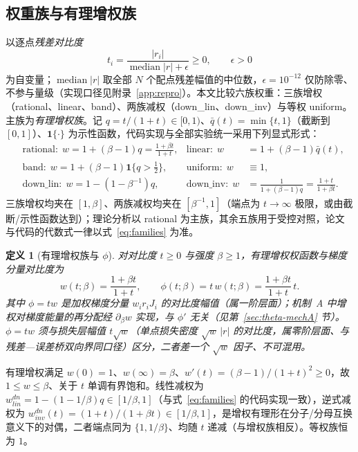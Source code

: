 \documentclass[fontset=windows,11pt]{ctexart}
\newtheorem{definition}{定义}[section]
\numberwithin{equation}{section}
\begin{document}
\subsection{权重族与有理增权族}\label{sec:family}
以逐点\emph{残差对比度}
\begin{equation}\label{eq:t-contrast}
t_i=\frac{|r_i|}{\operatorname{median}|r|+\epsilon}\ge0,\qquad \epsilon>0
\end{equation}
为自变量；$\operatorname{median}|r|$ 取全部 $N$ 个配点残差幅值的中位数，$\epsilon=10^{-12}$ 仅防除零、不参与量级（实现口径见附录~\ref{app:repro}）。本文比较六族权重：三族增权（rational、linear、band）、两族减权（down\_lin、down\_inv）与等权 uniform。主族为\emph{有理增权族}。记 $q=t/(1+t)\in[0,1)$、$\bar q(t)=\min\{t,1\}$（截断到 $[0,1]$）、$\mathbf 1\{\cdot\}$ 为示性函数，代码实现与全部实验统一采用下列显式形式：
\begin{equation}\label{eq:families}
\begin{aligned}
&\text{rational:}\ \ w=1+(\beta-1)q=\tfrac{1+\beta t}{1+t},
&\text{linear:}\ \ w&=1+(\beta-1)\bar q(t),\\
&\text{band:}\ \ w=1+(\beta-1)\mathbf 1\{q>\tfrac12\},
&\text{uniform:}\ \ w&\equiv1,\\
&\text{down\_lin:}\ \ w=1-(1-\beta^{-1})q,
&\text{down\_inv:}\ \ w&=\tfrac{1}{1+(\beta-1)q}=\tfrac{1+t}{1+\beta t}.
\end{aligned}
\end{equation}
三族增权均夹在 $[1,\beta]$、两族减权均夹在 $[\beta^{-1},1]$（端点为 $t\to\infty$ 极限，或由截断/示性函数达到）；理论分析以 rational 为主族，其余五族用于受控对照，论文与代码的代数式一律以式~\eqref{eq:families} 为准。

\begin{definition}[有理增权族与 $\phi$]\label{def:w}
对对比度 $t\ge0$ 与强度 $\beta\ge1$，有理增权权函数与\emph{梯度分量对比度}为
\begin{equation}\label{eq:rational}
w(t;\beta)=\frac{1+\beta t}{1+t},\qquad \phi(t;\beta)=t\,w(t;\beta)=\frac{1+\beta t}{1+t}\,t .
\end{equation}
其中 $\phi=tw$ 是加权梯度分量 $w_i r_i J_i$ 的对比度幅值（属一阶层面）；机制~A 中增权对梯度能量的再分配经 $\partial_\beta w$ 实现，与 $\phi'$ 无关（见第~\ref{sec:theta-mechA} 节）。$\phi=tw$ 须与\emph{损失层幅值} $t\sqrt w$（单点损失密度 $\sqrt w\,|r|$ 的对比度，属零阶层面、与残差—误差桥双向界同口径）区分，二者差一个 $\sqrt w$ 因子、不可混用。
\end{definition}

有理增权满足 $w(0)=1$、$w(\infty)=\beta$、$w'(t)=(\beta-1)/(1+t)^2\ge0$，故 $1\le w\le\beta$、关于 $t$ 单调有界饱和。线性减权为 $w^{dn}_{lin}=1-(1-1/\beta)q\in[1/\beta,1]$（与式~\eqref{eq:families} 的代码实现一致），逆式减权为 $w^{dn}_{inv}(t)=(1+t)/(1+\beta t)\in[1/\beta,1]$，是增权有理形在分子/分母互换意义下的对偶，二者端点同为 $\{1,1/\beta\}$、均随 $t$ 递减（与增权族相反）。等权族恒为 $1$。
\end{document}
